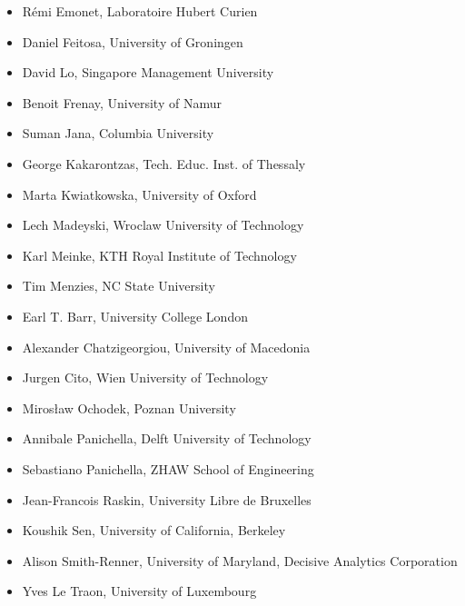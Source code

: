 \begin{itemize}[topsep=0.5em, itemsep=0.5em]
	\item Rémi Emonet, Laboratoire Hubert Curien
	\item Daniel Feitosa, University of Groningen
    \item David Lo, Singapore Management University
	\item Benoit Frenay, University of Namur
	\item Suman Jana, Columbia University
    \item George Kakarontzas, Tech. Educ. Inst. of Thessaly
	\item Marta Kwiatkowska, University of Oxford
	\item Lech Madeyski, Wroclaw University of Technology
	\item Karl Meinke, KTH Royal Institute of Technology
	\item Tim Menzies, NC State University
	\item Earl T. Barr, University College London
	\item Alexander Chatzigeorgiou, University of Macedonia
	\item Jurgen Cito, Wien University of Technology
	\item Mirosław Ochodek, Poznan University
	\item Annibale Panichella, Delft University of Technology
	\item Sebastiano Panichella, ZHAW School of Engineering
	\item Jean-Francois Raskin, University Libre de Bruxelles
	\item Koushik Sen, University of California, Berkeley
	\item Alison Smith-Renner, University of Maryland, Decisive Analytics Corporation 
	\item Yves Le Traon, University of Luxembourg
\end{itemize}
